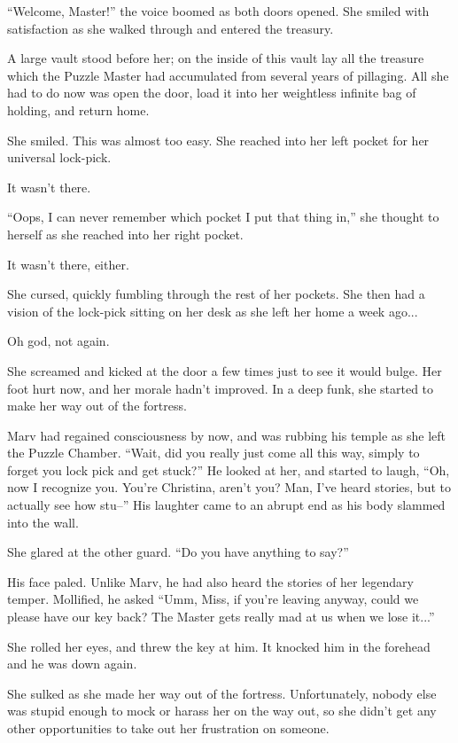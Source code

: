\documentclass[showtrims,b6paper,draft,10pt]{memoir}
\begin{document}
``Welcome, Master!''  the voice boomed as both doors opened.  She smiled with satisfaction as she walked through and entered the treasury.

A large vault stood before her;  on the inside of this vault lay all the treasure which the Puzzle Master had accumulated from several years of pillaging.  All she had to do now was open the door, load it into her weightless infinite bag of holding, and return home.

She smiled.  This was almost too easy.  She reached into her left pocket for her universal lock-pick.

It wasn’t there.

``Oops, I can never remember which pocket I put that thing in,'' she thought to herself as she reached into her right pocket.

It wasn’t there, either.

She cursed, quickly fumbling through the rest of her pockets.  She then had a vision of the lock-pick sitting on her desk as she left her home a week ago...

Oh god, not again.

She screamed and kicked at the door a few times just to see it would bulge.  Her foot hurt now, and her morale hadn’t improved.  In a deep funk, she started to make her way out of the fortress.

Marv had regained consciousness by now, and was rubbing his temple as she left the Puzzle Chamber.  ``Wait, did you really just come all this way, simply to forget you lock pick and get stuck?''  He looked at her, and started to laugh, ``Oh, now I recognize you.  You’re Christina, aren’t you?  Man, I’ve heard stories, but to actually see how stu--'' His laughter came to an abrupt end as his body slammed into the wall.

She glared at the other guard.  “Do you have anything to say?”

His face paled.  Unlike Marv, he had also heard the stories of her legendary temper.  Mollified, he asked  ``Umm, Miss, if you’re leaving anyway, could we please have our key back?  The Master gets really mad at us when we lose it...''

She rolled her eyes, and threw the key at him.  It knocked him in the forehead and he was down again.

\timeskip
She sulked as she made her way out of the fortress.  Unfortunately, nobody else was stupid enough to mock or harass her on the way out, so she didn’t get any other opportunities to take out her frustration on someone.
\end{document}
